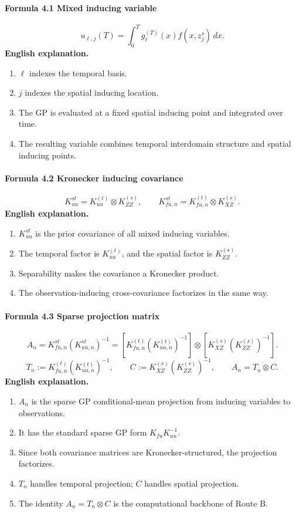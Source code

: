 \documentclass[12pt]{article}
\begin{document}
\paragraph{Formula 4.1 Mixed inducing variable}
\[
u_{\ell,j}(T)=\int_0^T g_\ell^{(T)}(x)f(x,z_j^s)\,dx.
\]
\textbf{English explanation.}
\begin{enumerate}[leftmargin=2em]
\item \(\ell\) indexes the temporal basis.
\item \(j\) indexes the spatial inducing location.
\item The GP is evaluated at a fixed spatial inducing point and integrated over time.
\item The resulting variable combines temporal interdomain structure and spatial inducing points.
\end{enumerate}

\paragraph{Formula 4.2 Kronecker inducing covariance}
\[
K_{uu}^{st}=K_{uu}^{(t)}\otimes K_{ZZ}^{(s)},
\qquad
K_{fu,n}^{st}=K_{fu,n}^{(t)}\otimes K_{XZ}^{(s)}.
\]
\textbf{English explanation.}
\begin{enumerate}[leftmargin=2em]
\item \(K_{uu}^{st}\) is the prior covariance of all mixed inducing variables.
\item The temporal factor is \(K_{uu}^{(t)}\), and the spatial factor is \(K_{ZZ}^{(s)}\).
\item Separability makes the covariance a Kronecker product.
\item The observation-inducing cross-covariance factorizes in the same way.
\end{enumerate}

\paragraph{Formula 4.3 Sparse projection matrix}
\[
A_n=K_{fu,n}^{st}(K_{uu,n}^{st})^{-1}
=
\left[K_{fu,n}^{(t)}(K_{uu,n}^{(t)})^{-1}\right]
\otimes
\left[K_{XZ}^{(s)}(K_{ZZ}^{(s)})^{-1}\right].
\]
\[
T_n:=K_{fu,n}^{(t)}(K_{uu,n}^{(t)})^{-1},
\qquad
C:=K_{XZ}^{(s)}(K_{ZZ}^{(s)})^{-1},
\qquad
A_n=T_n\otimes C.
\]
\textbf{English explanation.}
\begin{enumerate}[leftmargin=2em]
\item \(A_n\) is the sparse GP conditional-mean projection from inducing variables to observations.
\item It has the standard sparse GP form \(K_{fu}K_{uu}^{-1}\).
\item Since both covariance matrices are Kronecker-structured, the projection factorizes.
\item \(T_n\) handles temporal projection; \(C\) handles spatial projection.
\item The identity \(A_n=T_n\otimes C\) is the computational backbone of Route B.
\end{enumerate}
\end{document}
